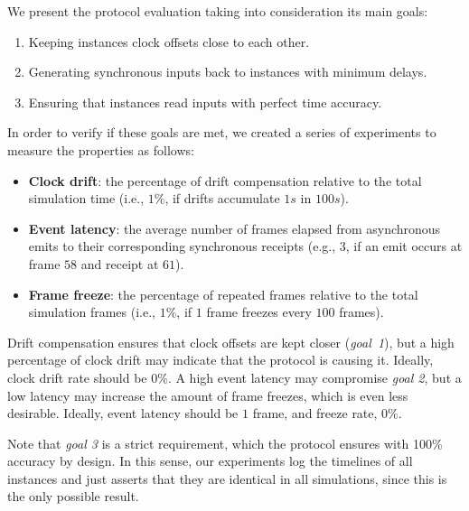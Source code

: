 \documentclass[sigplan,screen]{acmart}
\begin{document}
We present the protocol evaluation taking into consideration its main goals:
%
\begin{enumerate}
\item Keeping instances clock offsets close to each other.
\item Generating synchronous inputs back to instances with minimum delays.
\item Ensuring that instances read inputs with perfect time accuracy.
\end{enumerate}
%
In order to verify if these goals are met, we created a series of experiments
to measure the properties as follows:
%
\begin{itemize}
\item \textbf{Clock drift}:
    the percentage of drift compensation relative to the total simulation time
    (i.e., $1\%$, if drifts accumulate $1s$ in $100s$).
\item \textbf{Event latency}:
    the average number of frames elapsed from asynchronous emits to their
    corresponding synchronous receipts (e.g., $3$, if an emit occurs at frame
    $58$ and receipt at $61$).
\item \textbf{Frame freeze}:
    the percentage of repeated frames relative to the total simulation frames
    (i.e., $1\%$, if $1$ frame freezes every $100$ frames).

\end{itemize}
%
Drift compensation ensures that clock offsets are kept closer (\emph{goal~1}),
but a high percentage of clock drift may indicate that the protocol is causing it.
Ideally, clock drift rate should be $0\%$.
%
A high event latency may compromise \emph{goal 2}, but a low latency may
increase the amount of frame freezes, which is even less desirable.
Ideally, event latency should be $1$ frame, and freeze rate, $0\%$.
%

%
Note that \emph{goal 3} is a strict requirement, which the protocol ensures
with 100\% accuracy by design.
In this sense, our experiments log the timelines of all instances and just
asserts that they are identical in all simulations, since this is the only
possible result.
\end{document}
